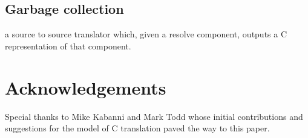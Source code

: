 \documentclass{sig-alternate}
\begin{document}





\subsection{Garbage collection}



a source to source translator which, given a resolve component, outputs a C representation of that component. 
 

\section{Acknowledgements}

Special thanks to Mike Kabanni and Mark Todd whose initial contributions and suggestions for the model of C translation paved the way to this paper. 



\end{document}
